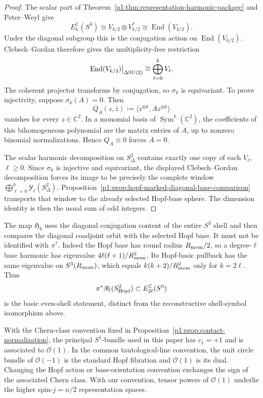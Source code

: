 \documentclass[11pt]{article}
\begin{document}
\begin{proof}
The scalar part of
Theorem~\ref{p1:thm:representation-harmonic-package} and Peter--Weyl give
\[
 E_k^{\mathbb C}(S^3)
 \cong V_{k/2}\otimes V_{k/2}^*
 \cong\operatorname{End}(V_{k/2}).
\]
Under the diagonal subgroup this is the conjugation action on
\(\operatorname{End}(V_{k/2})\).  Clebsch--Gordan therefore gives the
multiplicity-free restriction
\[
 \left.\operatorname{End}(V_{k/2})\right|_{\Delta\mathrm{SU}(2)}
 \cong
 \bigoplus_{\ell=0}^{k}V_\ell.
\]
The coherent projector transforms by conjugation, so \(\sigma_k\) is
equivariant.  To prove injectivity, suppose \(\sigma_k(A)=0\).  Then
\[
 Q_A(z,\bar z):=
 \langle z^{\otimes k},A z^{\otimes k}\rangle
\]
vanishes for every \(z\in\mathbb C^2\).  In a monomial basis of
\(\operatorname{Sym}^k(\mathbb C^2)\), the coefficients of this bihomogeneous
polynomial are the matrix entries of \(A\), up to nonzero binomial
normalizations.  Hence \(Q_A\equiv0\) forces \(A=0\).

The scalar harmonic decomposition on \(S^2_\Delta\) contains exactly one copy
of each \(V_\ell\), \(\ell\ge0\).  Since \(\sigma_k\) is injective and
equivariant, the displayed Clebsch--Gordan decomposition forces its image to
be precisely the complete window \(\bigoplus_{\ell=0}^{k}\mathscr
Y_\ell(S^2_\Delta)\).  Proposition~\ref{p1:prop:hopf-marked-diagonal-base-comparison}
transports that window to the already selected Hopf-base sphere.  The dimension
identity is then the usual sum of odd integers.
\end{proof}

\begin{remark}
\label{p1:rem:shell-symbol-not-hopf-pullback}
The map \(\mathfrak H_k\) uses the diagonal conjugation content of the entire
\(S^3\) shell and then compares the diagonal coadjoint orbit with the selected
Hopf base.  It must not be identified with \(\pi^*\).  Indeed the Hopf base has
round radius \(R_{\mathrm{mom}}/2\), so a degree-\(\ell\) base harmonic has eigenvalue
\(4\ell(\ell+1)/R_{\mathrm{mom}}^2\).  Its Hopf-basic pullback has the same eigenvalue on
\(S^3(R_{\mathrm{mom}})\), which equals \(k(k+2)/R_{\mathrm{mom}}^2\) only for \(k=2\ell\).  Thus
\[
 \pi^*\mathscr Y_\ell(S^2_{\rm Hopf})\subset E_{2\ell}^{\mathbb C}(S^3)
\]
is the basic even-shell statement, distinct from the reconstructive
shell-symbol isomorphism above.
\end{remark}

\begin{remark}
With the Chern-class convention fixed in Proposition~\ref{p1:prop:contact-normalization}, the principal \(S^1\)-bundle used in this paper has \(c_1=+1\) and is associated to \(\mathcal O(1)\).  In the common tautological-line convention, the unit circle bundle of \(\mathcal O(-1)\) is the standard Hopf fibration and \(\mathcal O(1)\) is its dual.  Changing the Hopf action or base-orientation convention exchanges the sign of the associated Chern class.  With our convention, tensor powers of \(\mathcal O(1)\) underlie the higher spin-\(j=n/2\) representation spaces.
\end{remark}
\end{document}
